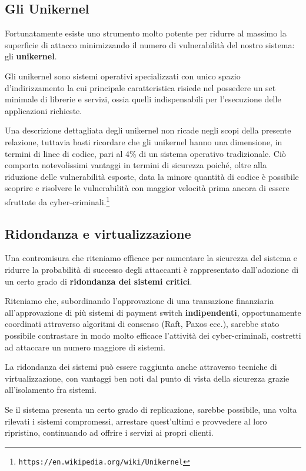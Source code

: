 \documentclass[10pt,a4paper, titlepage]{report}
\begin{document}
\subsection{Gli Unikernel}

Fortunatamente esiste uno strumento molto potente per ridurre al massimo la superficie di attacco minimizzando il numero di vulnerabilità del nostro sistema: gli \textbf{unikernel}. 

Gli unikernel sono sistemi operativi specializzati con unico spazio d'indirizzamento la cui principale caratteristica risiede nel possedere un set minimale di librerie e servizi, ossia quelli indispensabili per  l'esecuzione delle applicazioni richieste. 

Una descrizione dettagliata degli unikernel non ricade negli scopi della presente relazione, tuttavia basti ricordare che gli unikernel hanno una dimensione, in termini di linee di codice, pari al 4\% di un sistema operativo tradizionale. Ciò comporta notevolissimi vantaggi in termini di sicurezza poiché, oltre alla riduzione delle vulnerabilità esposte, data la minore quantità di codice è possibile scoprire e risolvere le vulnerabilità 
con maggior velocità prima ancora di essere sfruttate da cyber-criminali.\footnote{\texttt{https://en.wikipedia.org/wiki/Unikernel}}

\subsection{Ridondanza e virtualizzazione}

Una contromisura che riteniamo efficace per aumentare la sicurezza del sistema e ridurre la probabilità di successo degli attaccanti è rappresentato dall'adozione di un certo grado di \textbf{ridondanza dei sistemi critici}.

Riteniamo che, subordinando l'approvazione di una transazione finanziaria all'approvazione di più sistemi di payment switch \textbf{indipendenti}, opportunamente coordinati attraverso algoritmi di consenso (Raft, Paxos ecc.), sarebbe stato possibile contrastare in modo molto efficace l'attività dei cyber-criminali, costretti ad attaccare un numero maggiore di sistemi. 

La ridondanza dei sistemi può essere raggiunta anche attraverso tecniche di virtualizzazione, con vantaggi ben noti dal punto di vista della sicurezza grazie all'isolamento fra sistemi.

Se il sistema presenta un certo grado di replicazione, sarebbe possibile, una volta rilevati i sistemi compromessi, arrestare quest'ultimi e provvedere al loro ripristino, continuando ad offrire i servizi ai propri clienti.
\end{document}
